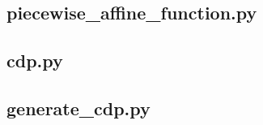\documentclass[fontsize=14pt]{scrartcl}
\theoremstyle{definition}
\begin{document}
\subsection{piecewise\_affine\_function.py} \label{piece}

\clearpage
\subsection{cdp.py} \label{cdppy}

\clearpage
\subsection{generate\_cdp.py} \label{gen}

\clearpage
\restoregeometry

\clearpage
\printbibliography %
\end{document}
